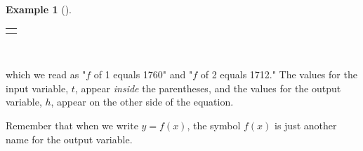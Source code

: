 \documentclass[10pt,]{book}
\theoremstyle{plain}
\theoremstyle{definition}
\theoremstyle{definition}
\theoremstyle{definition}
\newtheorem{example}[theorem]{Example}
\theoremstyle{definition}
\numberwithin{equation}{section}
\newlength{\panelmax}
\begin{document}
\begin{example}[]
{{{{}}}
\ifdefined\phAtabular\else\newlength{\phAtabular}\fi%
\setlength{\phAtabular}{\ht\panelboxAtabular+\dp\panelboxAtabular}
\settototalheight{\phAtabular}{\usebox{\panelboxAtabular}}
\setlength{\panelmax}{\maxof{\panelmax}{\phAtabular}}
\leavevmode%
\setlength{\tabcolsep}{0\linewidth}
\par\medskip\noindent
\begin{tabular}{@{}*{1}{c}@{}}
\begin{minipage}[c][\panelmax][t]{1\linewidth}\usebox{\panelboxAtabular}\end{minipage}\end{tabular}\\
}%
%
\par
\hypertarget{p-53}{}%
which we read as "\(f\) of 1 equals 1760" and "\(f\) of 2 equals 1712." The values for the input variable, \(t\), appear \emph{inside} the parentheses, and the values for the output variable, \(h\), appear on the other side of the equation.%
\end{example}
\hypertarget{p-54}{}%
Remember that when we write \(y = f(x)\), the symbol \(f(x)\) is just another name for the output variable.%
\typeout{************************************************}
\typeout{************************************************}
\end{document}
